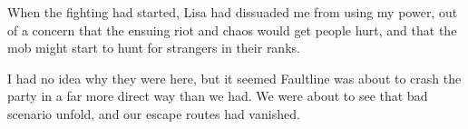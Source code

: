 When the fighting had started, Lisa had dissuaded me from using my power, out of a concern that the ensuing riot and chaos would get people hurt, and that the mob might start to hunt for strangers in their ranks.



I had no idea why they were here, but it seemed Faultline was about to crash the party in a far more direct way than we had.  We were about to see that bad scenario unfold, and our escape routes had vanished.





